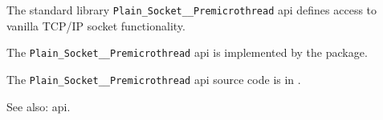 
The standard library {\tt Plain\_Socket\_\_Premicrothread} api defines access to vanilla {\sc TCP/IP} socket functionality.

The {\tt Plain\_Socket\_\_Premicrothread} api is implemented by the  package.

The {\tt Plain\_Socket\_\_Premicrothread} api source code is in .

See also:   api.



